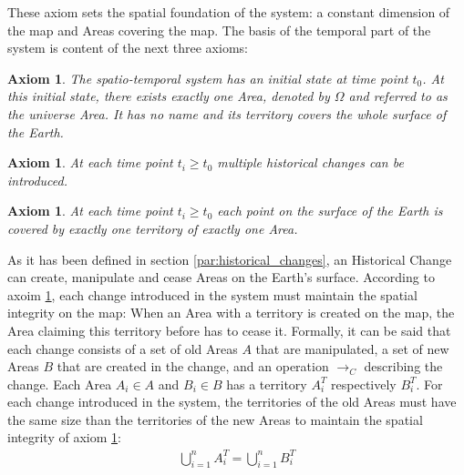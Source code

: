 These axiom sets the spatial foundation of the system: a constant dimension of the map and Areas covering the map. The basis of the temporal part of the system is content of the next three axioms:

\vspace{-1.0em}
\newtheorem{initial_configuration}[assicounter]{Axiom}
\begin{initial_configuration}
\label{axm:initial_configuration}
  The spatio-temporal system has an initial state at time point $t_0$. At this initial state, there exists exactly one Area, denoted by $\Omega$ and referred to as the \emph{universe} Area. It has no name and its territory covers the whole surface of the Earth.
\end{initial_configuration}

\vspace{-2.5em}
\newtheorem{historical_change}[assicounter]{Axiom}
\begin{historical_change}
\label{axm:historical_change}
  At each time point $t_i \geq t_0$ multiple historical changes can be introduced.
\end{historical_change}

\vspace{-2.5em}
\newtheorem{unique_coverage}[assicounter]{Axiom}
\begin{unique_coverage}
\label{axm:unique_coverage}
  At each time point $t_i \geq t_0$ each point on the surface of the Earth is covered by exactly one territory of exactly one Area.
\end{unique_coverage}

As it has been defined in section \ref{par:historical_changes}, an Historical Change can create, manipulate and cease Areas on the Earth's surface. According to axoim \ref{axm:unique_coverage}, each change introduced in the system must maintain the spatial integrity on the map: When an Area with a territory is created on the map, the Area claiming this territory before has to cease it. Formally, it can be said that each change consists of a set of old Areas $A$ that are manipulated, a set of new Areas $B$ that are created in the change, and an operation $\rightarrow_C$ describing the change. Each Area $A_i \in A$ and $B_i \in B$ has a territory $A_i^T$  respectively $B_i^T$. For each change introduced in the system, the territories of the old Areas must have the same size than the territories of the new Areas to maintain the spatial integrity of axiom \ref{axm:unique_coverage}:
\begin{align*}
  \bigcup\limits_{i=1}^n A_i^T ~\textbf{=}~ \bigcup\limits_{i=1}^n B_i^T
\end{align*}

